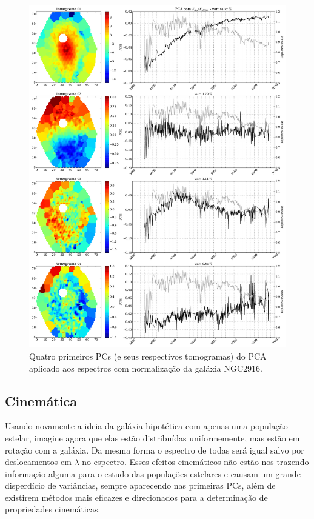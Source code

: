 \begin{figure}
    \includegraphics[width=1.\textwidth]{figuras/K0277-tomo1a4-norm.pdf}
    \caption[Tomogramas de 1 a 4 da gal\'axia NGC2916 - com normaliza\c{c}\~ao.]
    {Quatro primeiros PCs (e seus respectivos tomogramas) do PCA aplicado aos espectros com normalização da galáxia
    NGC2916.}
    \label{fig:UsoPCA:K277tomofobsnorm}
\end{figure}

\subsection{Cinemática}
\label{sec:UsoPCA:PCAlidades:cinem}

Usando novamente a ideia da galáxia hipotética com apenas uma população estelar, imagine agora que elas estão
distribuídas uniformemente, mas estão em rotação com a galáxia. Da mesma forma o espectro de todas será igual salvo por
deslocamentos em $\lambda$ no espectro. Esses efeitos cinemáticos não estão nos trazendo informação alguma para o estudo
das populações estelares e causam um grande disperdício de variâncias, sempre aparecendo nas primeiras PCs, além de
existirem métodos mais eficazes e direcionados para a determinação de propriedades cinemáticas.

